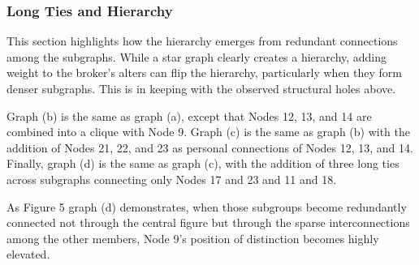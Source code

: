 
\subsubsection{Long Ties and Hierarchy}


This section highlights how the hierarchy emerges from redundant connections among the subgraphs. While a star graph clearly creates a hierarchy, adding weight to the broker's alters can flip the hierarchy, particularly when they form denser subgraphs. This is in keeping with the observed structural holes above. 

Graph (b) is the same as graph (a), except that Nodes 12, 13, and 14 are combined into a clique with Node 9. Graph (c) is the same as graph (b) with the addition of Nodes 21, 22, and 23 as personal connections of Nodes 12, 13, and 14. Finally, graph (d) is the same as graph (c), with the addition of three long ties across subgraphs connecting only Nodes 17 and 23 and 11 and 18.

As Figure 5 graph (d) demonstrates, when those subgroups become redundantly connected not through the central figure but through the sparse interconnections among the other members, Node 9's position of distinction becomes highly elevated.

